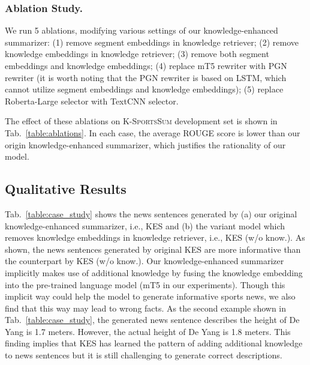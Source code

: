 \subsubsection{Ablation Study.}
We run 5 ablations, modifying various settings of our knowledge-enhanced summarizer: 
(1) remove segment embeddings in knowledge retriever; (2) remove knowledge embeddings in knowledge retriever; (3) remove both segment embeddings and knowledge embeddings; (4) replace mT5 rewriter with PGN rewriter (it is worth noting that the PGN rewriter is based on LSTM, which cannot utilize segment embeddings and knowledge embeddings); (5) replace Roberta-Large selector with TextCNN selector.

The effect of these ablations on \textsc{K-SportsSum} development set is shown in Tab.~\ref{table:ablations}. In each case, the average ROUGE score is lower than our origin knowledge-enhanced summarizer, which justifies the rationality of our model.

\subsection{Qualitative Results}
Tab.~\ref{table:case_study} shows the news sentences generated by (a) our original knowledge-enhanced summarizer, i.e., KES and (b) the variant model which removes knowledge embeddings in knowledge retriever, i.e., KES (w/o know.).
As shown, the news sentences generated by original KES are more informative than the counterpart by KES (w/o know.).
Our knowledge-enhanced summarizer implicitly makes use of additional knowledge by fusing the knowledge embedding into the pre-trained language model (mT5 in our experiments).
Though this implicit way could help the model to generate informative sports news, we also find that this way may lead to wrong facts. As the second example shown in Tab.~\ref{table:case_study}, the generated news sentence describes the height of De Yang is 1.7 meters. However, the actual height of De Yang is 1.8 meters.
This finding implies that KES has learned the pattern of adding additional knowledge to news sentences but it is still challenging to generate correct descriptions. 

